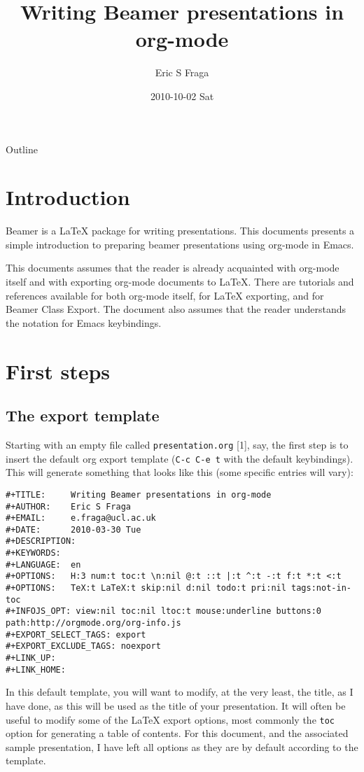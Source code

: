 \documentclass[presentation]{beamer}
\author{Eric S Fraga}
\date{2010-10-02 Sat}
\title{Writing Beamer presentations in org-mode}
\begin{document}
\maketitle
\begin{frame}{Outline}
\tableofcontents
\end{frame}


\section{Introduction}
\label{sec:orgcba6fdb}

Beamer is a \LaTeX{} package for writing presentations.  This documents
presents a simple introduction to preparing beamer presentations using
org-mode in Emacs.

This documents assumes that the reader is already acquainted with org-mode
itself and with \alert{exporting} org-mode documents to \LaTeX{}.  There are tutorials
and references available for both org-mode itself, for
\LaTeX{} exporting, and
for
Beamer
Class Export.  The document also assumes that the reader understands the
notation for
Emacs
keybindings.

\section{First steps}
\label{sec:orgce18ac7}
\subsection{The export template}
\label{sec:orgd16929e}
Starting with an empty file called \texttt{presentation.org} [1], say, the
first step is to insert the default org export template (\texttt{C-c C-e t}
with the default keybindings). This will generate something that looks
like this (some specific entries will vary):

\begin{verbatim}
#+TITLE:     Writing Beamer presentations in org-mode
#+AUTHOR:    Eric S Fraga
#+EMAIL:     e.fraga@ucl.ac.uk
#+DATE:      2010-03-30 Tue
#+DESCRIPTION:
#+KEYWORDS:
#+LANGUAGE:  en
#+OPTIONS:   H:3 num:t toc:t \n:nil @:t ::t |:t ^:t -:t f:t *:t <:t
#+OPTIONS:   TeX:t LaTeX:t skip:nil d:nil todo:t pri:nil tags:not-in-toc
#+INFOJS_OPT: view:nil toc:nil ltoc:t mouse:underline buttons:0 path:http://orgmode.org/org-info.js
#+EXPORT_SELECT_TAGS: export
#+EXPORT_EXCLUDE_TAGS: noexport
#+LINK_UP:
#+LINK_HOME:
\end{verbatim}

In this default template, you will want to modify, at the very least,
the title, as I have done, as this will be used as the title of your
presentation.  It will often be useful to modify some of the \LaTeX{}
export options, most commonly the \texttt{toc} option for generating a table
of contents.  For this document, and the associated sample
presentation, I have left all options as they are by default according
to the template.
\end{document}
